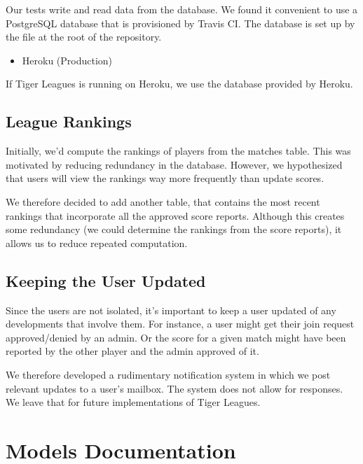 \documentclass[letterpaper,10pt,english]{sphinxmanual}
\begin{document}
Our tests write and read data from the database. We found it convenient to
use a PostgreSQL database that is provisioned by Travis CI. The database is
set up by the  file at the root of the repository.
\begin{itemize}
\item {} 
Heroku (Production)

\end{itemize}

If Tiger Leagues is running on Heroku, we use the database provided by Heroku.


\subsection{League Rankings}
\label{\detokenize{tiger_leagues/models/readme:league-rankings}}\label{\detokenize{tiger_leagues/models/readme:league-standings}}
Initially, we’d compute the rankings of players from the matches table. This
was motivated by reducing redundancy in the database. However, we hypothesized
that users will view the rankings way more frequently than update scores.

We therefore decided to add another table,  that contains
the most recent rankings that incorporate all the approved score reports.
Although this creates some redundancy (we could determine the rankings from
the score reports), it allows us to reduce repeated computation.


\subsection{Keeping the User Updated}
\label{\detokenize{tiger_leagues/models/readme:keeping-the-user-updated}}\label{\detokenize{tiger_leagues/models/readme:id2}}
Since the users are not isolated, it’s important to keep a user updated of any
developments that involve them. For instance, a user might get their join
request approved/denied by an admin. Or the score for a given match might have
been reported by the other player and the admin approved of it.

We therefore developed a rudimentary notification system in which we post
relevant updates to a user’s mailbox. The system does not allow for responses.
We leave that for future implementations of Tiger Leagues.


\section{Models Documentation}
\label{\detokenize{tiger_leagues/models/readme:models-documentation}}\label{\detokenize{tiger_leagues/models/readme:id3}}
\end{document}
